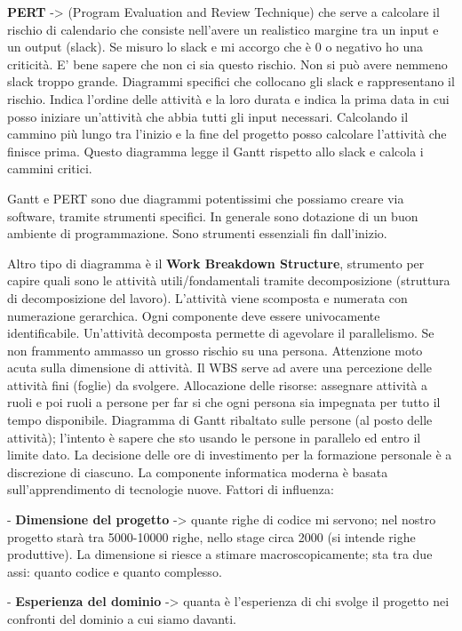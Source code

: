 \textbf{PERT} -> (Program Evaluation and Review Technique) che serve a calcolare il rischio di calendario che consiste nell'avere un realistico margine tra un input e un output (slack). Se misuro lo slack e mi accorgo che è 0 o negativo ho una criticità. E' bene sapere che non ci sia questo rischio. Non si può avere nemmeno slack troppo grande. Diagrammi specifici che collocano gli slack e rappresentano il rischio. Indica l'ordine delle attività e la loro durata e indica la prima data in cui posso iniziare un'attività che abbia tutti gli input necessari. Calcolando il cammino più lungo tra l'inizio e la fine del progetto posso calcolare l'attività che finisce prima. Questo diagramma legge il Gantt rispetto allo slack e calcola i cammini critici. 

Gantt e PERT sono due diagrammi potentissimi che possiamo creare via software, tramite strumenti specifici. In generale sono dotazione di un buon ambiente di programmazione. Sono strumenti essenziali fin dall'inizio.

Altro tipo di diagramma è il \textbf{Work Breakdown Structure}, strumento per capire quali sono le attività utili/fondamentali tramite decomposizione (struttura di decomposizione del lavoro). L'attività viene scomposta e numerata con numerazione gerarchica. Ogni componente deve essere univocamente identificabile. Un'attività decomposta permette di agevolare il parallelismo. Se non frammento ammasso un grosso rischio su una persona. Attenzione moto acuta sulla dimensione di attività. Il WBS serve ad avere una percezione delle attività fini (foglie) da svolgere. Allocazione delle risorse: assegnare attività a ruoli e poi ruoli a persone per far si che ogni persona sia impegnata per tutto il tempo disponibile. Diagramma di Gantt ribaltato sulle persone (al posto delle attività); l'intento è sapere che sto usando le persone in parallelo ed entro il limite dato. La decisione delle ore di investimento per la formazione personale è a discrezione di ciascuno. La componente informatica moderna è basata sull'apprendimento di tecnologie nuove.
Fattori di influenza:

- \textbf{Dimensione del progetto} -> quante righe di codice mi servono; nel nostro progetto starà tra 5000-10000 righe, nello stage circa 2000 (si intende righe produttive). La dimensione si riesce a stimare macroscopicamente; sta tra due assi: quanto codice e quanto complesso.

- \textbf{Esperienza del dominio} -> quanta è l'esperienza di chi svolge il progetto nei confronti del dominio a cui siamo davanti.

